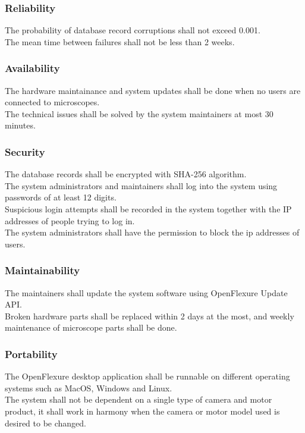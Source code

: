 \subsubsection{Reliability}
\req The probability of database record corruptions shall not exceed 0.001. \\
\req The mean time between failures shall not be less than 2 weeks. \\

\subsubsection{Availability}
\req The hardware maintainance and system updates shall be done when no users are connected to microscopes. \\
\req The technical issues shall be solved by the system maintainers at most 30 minutes. \\

\subsubsection{Security}
\req The database records shall be encrypted with SHA-256 algorithm. \\
\req The system administrators and maintainers shall log into the system using passwords of at least 12 digits. \\
\req Suspicious login attempts shall be recorded in the system together with the IP addresses of people trying to log in. \\
\req The system administrators shall have the permission to block the ip addresses of users. \\

\subsubsection{Maintainability}
\req The maintainers shall update the system software using OpenFlexure Update API. \\
\req Broken hardware parts shall be replaced within 2 days at the most, and weekly maintenance of microscope parts shall be done.\\

\subsubsection{Portability}
\req The OpenFlexure desktop application shall be runnable on different operating systems such as MacOS, Windows and Linux. \\
\req The system shall not be dependent on a single type of camera and motor product, it shall work in harmony when the camera or motor model used is desired to be changed. \\


